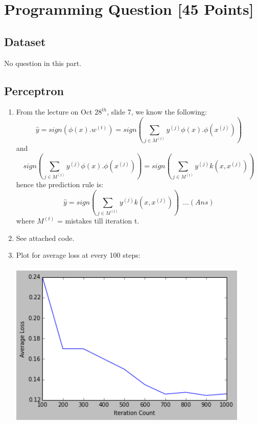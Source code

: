 \documentclass[letterpaper]{article}
\begin{document}
\section{Programming Question [45 Points]}

\subsection{Dataset}
No question in this part.

\subsection{Perceptron}
\begin{enumerate}

\item
From the lecture on Oct $28^{th}$, slide 7, we know the following:
\begin{equation}
\hat{y} = sign(\phi(x).w^{(t)}) = sign(\sum_{j \in M^{(t)}}{y^{(j)}\phi(x).\phi(x^{(j)})})
\end{equation}
and
\begin{equation}
sign(\sum_{j \in M^{(t)}}{y^{(j)}\phi(x).\phi(x^{(j)})}) = sign(\sum_{j \in M^{(t)}}{y^{(j)}k(x, x^{(j)})})
\end{equation}
hence the prediction rule is:
\begin{equation}
\hat{y} = sign(\sum_{j \in M^{(t)}}{y^{(j)}k(x, x^{(j)})}) \,\,\, ...(Ans)
\end{equation}
 where $M^{(t)}$ = mistakes till iteration t.

\item See attached code.

\item Plot for average loss at every 100 steps:\\ \\
\includegraphics[width = 4.5in,keepaspectratio]{HW3_figure3.png}


\end{enumerate}
\end{document}
